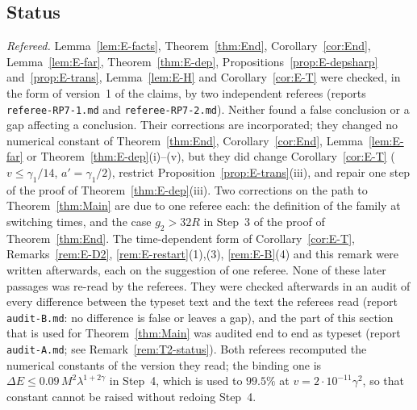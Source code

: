 \subsection{Status}

\begin{remark}[Status]\label{rem:E-status}
\emph{Refereed.} Lemma~\ref{lem:E-facts}, Theorem~\ref{thm:End}, Corollary~\ref{cor:End}, Lemma~\ref{lem:E-far},
Theorem~\ref{thm:E-dep}, Propositions~\ref{prop:E-depsharp} and~\ref{prop:E-trans}, Lemma~\ref{lem:E-H} and Corollary~\ref{cor:E-T}
were checked, in the form of version~1 of the claims, by two independent referees (reports \texttt{referee-RP7-1.md} and
\texttt{referee-RP7-2.md}). Neither found a false conclusion or a gap affecting a conclusion. Their corrections are incorporated;
they changed no numerical constant of Theorem~\ref{thm:End}, Corollary~\ref{cor:End}, Lemma~\ref{lem:E-far} or
Theorem~\ref{thm:E-dep}(i)--(v), but they did change Corollary~\ref{cor:E-T} ($v\le\gamma_1/14$, $a'=\gamma_1/2$), restrict
Proposition~\ref{prop:E-trans}(iii), and repair one step of the proof of Theorem~\ref{thm:E-dep}(iii). Two corrections on the path
to Theorem~\ref{thm:Main} are due to one referee each: the definition of the family at switching times, and the case
$g_2>32R$ in Step~3 of the proof of Theorem~\ref{thm:End}. The time-dependent form of Corollary~\ref{cor:E-T},
Remarks~\ref{rem:E-D2}, \ref{rem:E-restart}(1),(3), \ref{rem:E-B}(4) and this remark were written afterwards, each on the
suggestion of one referee. None of these later passages was re-read by the referees. They were checked afterwards in an audit of
every difference between the typeset text and the text the referees read (report \texttt{audit-B.md}: no difference is false or
leaves a gap), and the part of this section that is used for Theorem~\ref{thm:Main} was audited end to end as typeset (report
\texttt{audit-A.md}; see Remark~\ref{rem:T2-status}). Both
referees recomputed the numerical constants of the version they read; the binding one is $\Delta E\le0.09\,M^2\lambda^{1+2\gamma}$ in Step~4, which is used to
$99.5\%$ at $v=2\cdot10^{-11}\gamma^2$, so that constant cannot be raised without redoing Step~4.


\end{remark}
